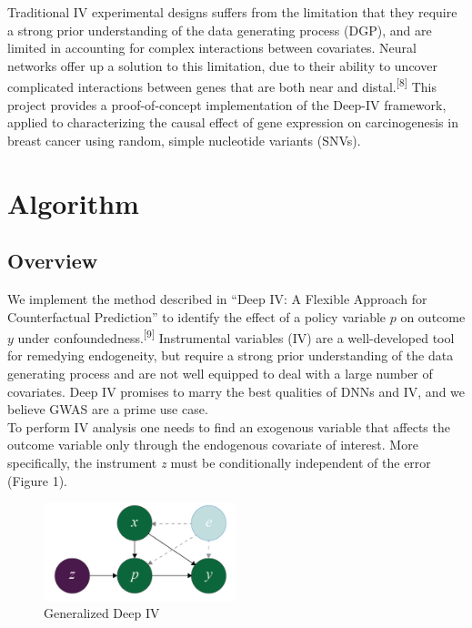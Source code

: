 \documentclass[10.5pt, oneside, twocolumn]{article}   	%
\begin{document}
Traditional IV experimental designs suffers from the limitation that they require a strong prior understanding of the data generating process (DGP), and are limited in accounting for complex interactions between covariates. Neural networks offer up a solution to this limitation, due to their ability to uncover complicated interactions between genes that are both near and distal.\textsuperscript{[8]} This project provides a proof-of-concept implementation of the Deep-IV framework, applied to characterizing the causal effect of gene expression on carcinogenesis in breast cancer using random, simple nucleotide variants (SNVs). 



\section{Algorithm}
\subsection{Overview}
We implement the method described in ``Deep IV: A Flexible Approach for Counterfactual Prediction'' to identify the effect of a policy variable $p$ on outcome $y$ under confoundedness.\textsuperscript{[9]} Instrumental variables (IV) are a well-developed tool for remedying endogeneity, but require a strong prior understanding of the data generating process and are not well equipped to deal with a large number of covariates. Deep IV promises to marry the best qualities of DNNs and IV, and we believe GWAS are a prime use case. \\

To perform IV analysis one needs to find an exogenous variable that affects the outcome variable only through the endogenous covariate of interest. More specifically, the instrument \emph{z} must be conditionally independent of the error (Figure 1).\\

\begin{figure}[h]
	\caption{Generalized Deep IV}
	\centering
	\includegraphics[width=0.5\textwidth]{Figure_1.png}
\end{figure}
\end{document}
